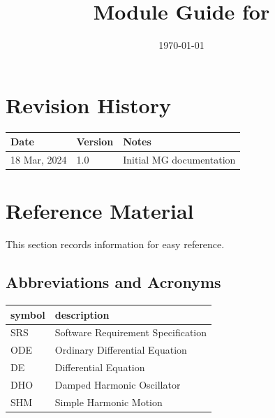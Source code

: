 \documentclass[12pt, titlepage]{article}
\begin{document}
\title{Module Guide for \progname{}} 
\author{\authname}
\date{\today}

\maketitle


\section{Revision History}

\begin{tabularx}{\textwidth}{p{3cm}p{2cm}X}
\toprule {\bf Date} & {\bf Version} & {\bf Notes}\\
\midrule
18 Mar, 2024 & 1.0 & Initial MG documentation\\
\bottomrule
\end{tabularx}

\newpage

\section{Reference Material}

This section records information for easy reference.

\subsection{Abbreviations and Acronyms}

\renewcommand{\arraystretch}{1.2}
\begin{tabular}{l l} 
  \toprule		
  \textbf{symbol} & \textbf{description}\\
  \midrule 
  SRS & Software Requirement Specification\\
  ODE & Ordinary Differential Equation\\
  DE & Differential Equation\\
  DHO & Damped Harmonic Oscillator\\
  SHM & Simple Harmonic Motion\\
  \bottomrule
\end{tabular}\\

\newpage

\tableofcontents

\listoftables

\listoffigures

\newpage
\end{document}
